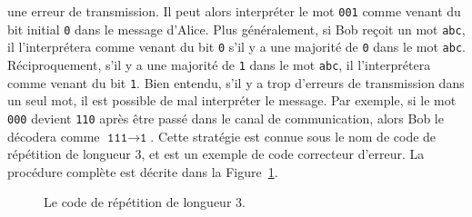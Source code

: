 une erreur de transmission. Il peut alors interpréter le mot \texttt{001} comme
venant du bit initial \texttt{0} dans le message d'Alice. Plus généralement, si
Bob reçoit un mot \texttt{abc}, il l'interprétera comme venant du bit
\texttt{0} s'il y a une majorité de \texttt{0} dans le mot \texttt{abc}.
Réciproquement, s'il y a une majorité de \texttt{1} dans le mot
\texttt{abc}, il l'interprétera comme venant du bit \texttt{1}. Bien entendu,
s'il y a trop d'erreurs de transmission dans un seul mot, il est possible de mal
interpréter le message. Par exemple, si le mot \texttt{000} devient
\texttt{110} après être passé dans le canal de communication, alors Bob
le décodera comme $\texttt{111}\to\texttt{1}$. Cette stratégie est connue sous
le nom de code de répétition de longueur $3$, et est un exemple de code
correcteur d'erreur. La procédure complète est décrite dans la
Figure~\ref{fig:rep3}.
\begin{figure}
  \centering
  \caption{Le code de répétition de longueur $3$.}
  \label{fig:rep3}
\end{figure}
